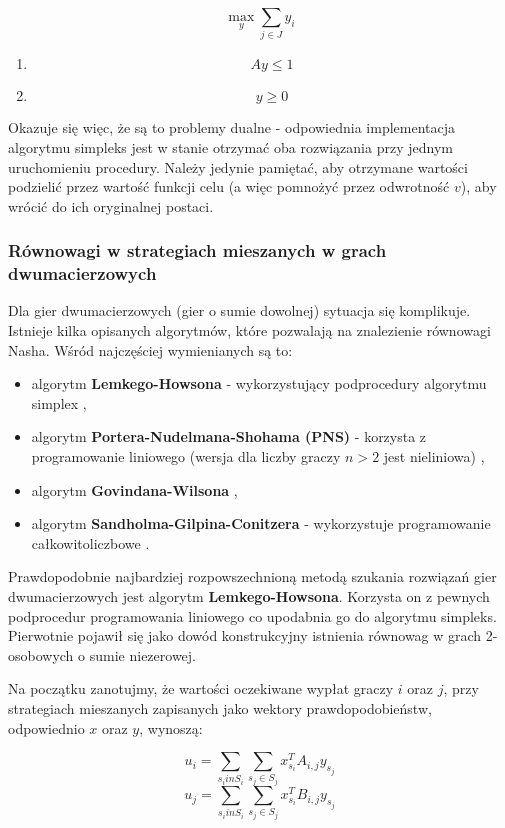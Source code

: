 \documentclass[polish]{standalone}
\begin{document}
$$\max_y \sum_{j \in J} y_i$$
\begin{enumerate}
\item $$Ay \leq 1$$
\item $$y \geq 0$$
\end{enumerate}

Okazuje się więc, że są to problemy dualne - odpowiednia implementacja algorytmu simpleks jest w stanie otrzymać oba
rozwiązania przy jednym uruchomieniu procedury. Należy jedynie pamiętać, aby otrzymane wartości podzielić przez wartość
funkcji celu (a więc pomnożyć przez odwrotność $v$), aby wrócić do ich oryginalnej postaci.

\subsubsection{Równowagi w strategiach mieszanych w grach dwumacierzowych}

Dla gier dwumacierzowych (gier o sumie dowolnej) sytuacja się komplikuje. Istnieje kilka opisanych algorytmów, które
pozwalają na znalezienie równowagi Nasha. Wśród najczęściej wymienianych są to:
\begin{itemize}
\item algorytm \textbf{Lemkego-Howsona} - wykorzystujący podprocedury algorytmu simplex \cite{LH-NE},
\item algorytm \textbf{Portera-Nudelmana-Shohama (PNS)} - korzysta z programowanie liniowego (wersja dla liczby graczy
$n > 2$ jest nieliniowa) \cite{PNS-NE},
\item algorytm \textbf{Govindana-Wilsona}  \cite{GR-NE},
\item algorytm \textbf{Sandholma-Gilpina-Conitzera} - wykorzystuje programowanie całkowitoliczbowe \cite{SCG-NE}.
\end{itemize}

Prawdopodobnie najbardziej rozpowszechnioną metodą szukania rozwiązań gier dwumacierzowych jest algorytm
\textbf{Lemkego-Howsona}. Korzysta on z pewnych podprocedur programowania liniowego co upodabnia go do algorytmu
simpleks. Pierwotnie pojawił się jako dowód konstrukcyjny istnienia równowag w grach 2-osobowych o sumie niezerowej.

Na początku zanotujmy, że wartości oczekiwane wypłat graczy $i$ oraz $j$, przy strategiach mieszanych zapisanych jako
wektory prawdopodobieństw, odpowiednio $x$ oraz $y$, wynoszą:

$$u_i = \sum_{s_i in S_i}\sum_{s_j \in S_j} x_{s_i}^{T} A_{i,j} y_{s_j}$$
$$u_j = \sum_{s_i in S_i}\sum_{s_j \in S_j} x_{s_i}^{T} B_{i,j} y_{s_j}$$
\end{document}
